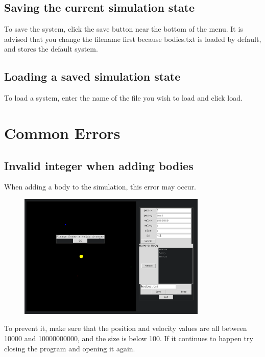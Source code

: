 \documentclass[a4paper,11pt,titlepage]{article}
\begin{document}
\subsection{Saving the current simulation state}
To save the system, click the save button near the bottom of the menu. It is
advised that you change the filename first because bodies.txt is loaded by
default, and stores the default system.

\subsection{Loading a saved simulation state}
To load a system, enter the name of the file you wish to load and click load.

\section{Common Errors}
\subsection{Invalid integer when adding bodies}
When adding a body to the simulation, this error may occur.
\begin{figure}[H]
	\centering
	\includegraphics[width=0.8\textwidth]{../img/add2.png}
\end{figure}
To prevent it, make sure that the position and velocity values are all between
10000 and 10000000000, and the size is below 100. If it continues to happen try
closing the program and opening it again.
\end{document}
